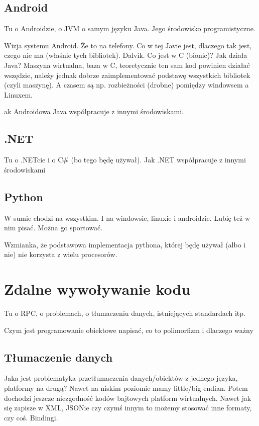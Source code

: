 \documentclass[twoside,a4paper]{book}
\begin{document}
\subsection{Android}
Tu o Androidzie, o JVM o samym języku Java. Jego środowisko programistyczne.

Wizja systemu Android. Że to na telefony. Co w tej Javie jest, dlaczego tak jest, czego nie ma (właśnie tych bibliotek). Dalvik. Co jest w C (bionic)?
Jak działa Java? Maszyna wirtualna, baza w C, teoretycznie ten sam kod powinien działać wszędzie, należy jednak dobrze zaimplementować podstawę wszystkich bibliotek (czyli maszynę). A czasem są np. rozbieżności (drobne) pomiędzy windowsem a Linuxem.

ak Androidowa Java współpracuje z innymi środowiskami.


\subsection{.NET}
Tu o .NETcie i o C\# (bo tego będę używał).
Jak .NET współpracuje z innymi środowiskami

\subsection{Python}
W sumie chodzi na wszystkim. I na windowsie, linuxie i androidzie. Lubię też w nim pisać. Można go sportować.

Wzmianka, że podstawowa implementacja pythona, której będę używał (albo i nie) nie korzysta z wielu procesorów.

\section{Zdalne wywoływanie kodu}
Tu o RPC, o problemach, o tłumaczeniu danych, istniejących standardach itp.

Czym jest programowanie obiektowe napisać, co to polimorfizm i dlaczego ważny

\subsection{Tłumaczenie danych}
Jaka jest problematyka przetłumaczenia danych/obiektów z jednego języka, platformy na drugą?
Nawet na niskim poziomie mamy little/big endian. Potem dochodzi jeszcze niezgodność kodów bajtowych platform wirtualnych.
Nawet jak się zapisze w XML, JSONie czy czymś innym to możemy stosować inne formaty, czy coś. Bindingi.
\end{document}
